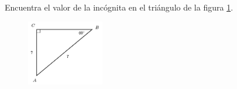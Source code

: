 \question[15]  Encuentra el valor de la incógnita en el triángulo de la figura \ref{fig:lados_functrig_01}.
\begin{figure}[H]
    \begin{center}
        \includegraphics[width=0.3\textwidth]{../images/lados_functrig_01.png}
    \end{center}
    \caption{}
    \label{fig:lados_functrig_01}
\end{figure}